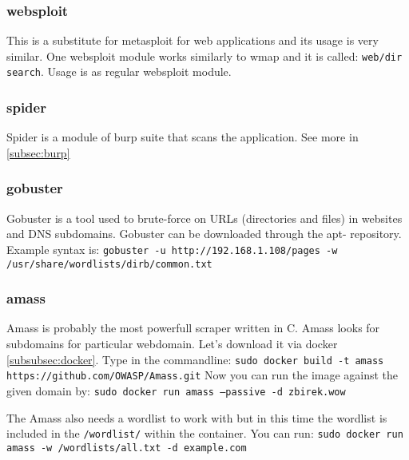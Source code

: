 \documentclass{article}[12pt]
\newcommand{\q}[1]{\texttt{#1}}
\begin{document}
\subsubsection{websploit}
\label{subsubsec:websploit}

This is a substitute for metasploit for web applications and its usage is very similar.
One websploit module works similarly to wmap and it is called: \texttt{web/dir search}.
Usage is as regular websploit module.


\subsubsection{spider}
Spider is a module of burp suite that scans the application.
See more in \ref{subsec:burp}

\subsubsection{gobuster}
\label{subsubsec:gobuster}
Gobuster is a tool used to brute-force on URLs (directories and files) in websites and DNS subdomains.
Gobuster can be downloaded through the apt- repository.
Example syntax is: \newline
\q{gobuster -u http://192.168.1.108/pages -w /usr/share/wordlists/dirb/common.txt}


\subsubsection{amass}
\label{subsubsec:amass}
Amass is probably the most powerfull scraper written in C.
Amass looks for subdomains for particular webdomain.
Let's download it via docker \ref{subsubsec:docker}.
Type in the commandline: \newline
\q{sudo docker build -t amass https://github.com/OWASP/Amass.git} \newline
Now you can run the image against the given domain by: \newline
\q{sudo docker run amass --passive -d zbirek.wow}

The Amass also needs a wordlist to work with but in this time the wordlist is included in the \q{/wordlist/} within the container.
You can run: \q{sudo docker run amass -w /wordlists/all.txt -d example.com}




%
%
\end{document}
